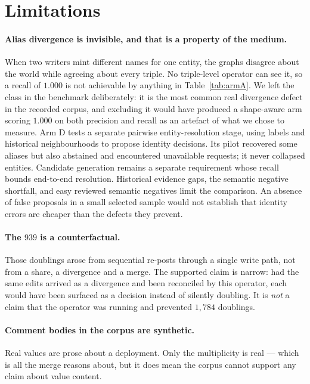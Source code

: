 \section{Limitations}
\label{sec:limits}

\paragraph{Alias divergence is invisible, and that is a property of the medium.}
When two writers mint different names for one entity, the graphs disagree about
the world while agreeing about every triple. No triple-level operator can see
it, so a recall of $1.000$ is not achievable by anything in Table~\ref{tab:armA}.
We left the class in the benchmark deliberately: it is the most common real
divergence defect in the recorded corpus, and excluding it would have produced a
shape-aware arm scoring $1.000$ on both precision and recall as an artefact of
what we chose to measure. Arm D tests a separate pairwise entity-resolution stage, using labels and
historical neighbourhoods to propose identity decisions. Its pilot recovered
some aliases but also abstained and encountered unavailable requests; it never
collapsed entities. Candidate generation remains a separate requirement whose
recall bounds end-to-end resolution. Historical evidence gaps, the semantic
negative shortfall, and easy reviewed semantic negatives limit the comparison.
An absence of false proposals in a small selected sample would not establish
that identity errors are cheaper than the defects they prevent.

\paragraph{The $939$ is a counterfactual.} Those doublings arose from sequential
re-posts through a single write path, not from a share, a divergence and a merge.
The supported claim is narrow: had the same edits arrived as a divergence and
been reconciled by this operator, each would have been surfaced as a decision
instead of silently doubling. It is \emph{not} a claim that the operator was
running and prevented $1{,}784$ doublings.

\paragraph{Comment bodies in the corpus are synthetic.} Real values are prose
about a deployment. Only the multiplicity is real --- which is all the merge
reasons about, but it does mean the corpus cannot support any claim about value
content.

